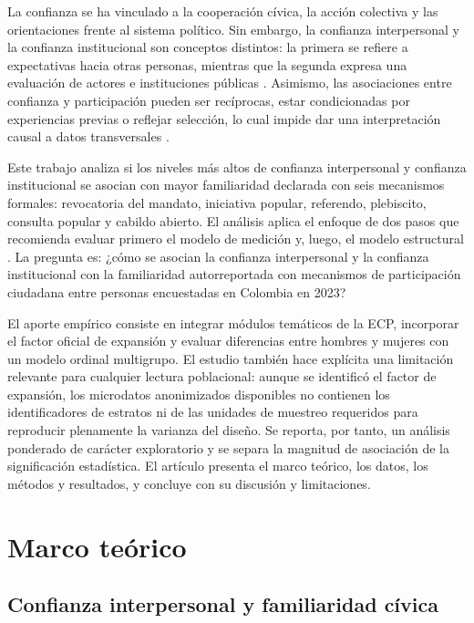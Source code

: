 \documentclass[11pt,letterpaper]{article}
\begin{document}
La confianza se ha vinculado a la cooperación cívica, la acción colectiva y las orientaciones frente al sistema político. Sin embargo, la confianza interpersonal y la confianza institucional son conceptos distintos: la primera se refiere a expectativas hacia otras personas, mientras que la segunda expresa una evaluación de actores e instituciones públicas \citep{LeviStoker2000,DelheyNewton2005}. Asimismo, las asociaciones entre confianza y participación pueden ser recíprocas, estar condicionadas por experiencias previas o reflejar selección, lo cual impide dar una interpretación causal a datos transversales \citep{vanIngenBekkers2015,Devine2024}.

Este trabajo analiza si los niveles más altos de confianza interpersonal y confianza institucional se asocian con mayor familiaridad declarada con seis mecanismos formales: revocatoria del mandato, iniciativa popular, referendo, plebiscito, consulta popular y cabildo abierto. El análisis aplica el enfoque de dos pasos que recomienda evaluar primero el modelo de medición y, luego, el modelo estructural \citep{AndersonGerbing1988}. La pregunta es: ¿cómo se asocian la confianza interpersonal y la confianza institucional con la familiaridad autorreportada con mecanismos de participación ciudadana entre personas encuestadas en Colombia en 2023?

El aporte empírico consiste en integrar módulos temáticos de la ECP, incorporar el factor oficial de expansión y evaluar diferencias entre hombres y mujeres con un modelo ordinal multigrupo. El estudio también hace explícita una limitación relevante para cualquier lectura poblacional: aunque se identificó el factor de expansión, los microdatos anonimizados disponibles no contienen los identificadores de estratos ni de las unidades de muestreo requeridos para reproducir plenamente la varianza del diseño. Se reporta, por tanto, un análisis ponderado de carácter exploratorio y se separa la magnitud de asociación de la significación estadística. El artículo presenta el marco teórico, los datos, los métodos y resultados, y concluye con su discusión y limitaciones.

\section{Marco teórico}
\label{sec:marco}

\subsection{Confianza interpersonal y familiaridad cívica}
\end{document}
